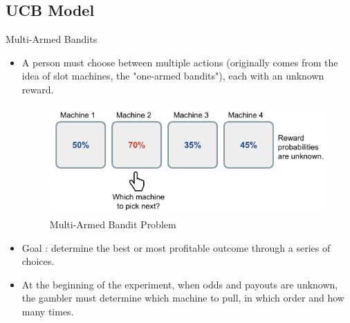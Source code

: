 \documentclass{IFES-beamer}
\begin{document}
    \subsection{UCB Model}
        \begin{frame}{Multi-Armed Bandits}
            \begin{itemize}
                \item A person must choose between multiple actions (originally comes from the idea of slot machines, the "one-armed bandits"), each with an unknown reward.
                \begin{figure}[H]
                    \centering
                    \includegraphics[scale=0.1]{Images/mab.png}
                    \caption{Multi-Armed Bandit Problem}
                    \label{fig:mab}
                \end{figure}
                \item Goal : determine the best or most profitable outcome through a series of choices.
                \item At the beginning of the experiment, when odds and payouts are unknown, the gambler must determine which machine to pull, in which order and how many times. 
            \end{itemize}
        \end{frame}
\end{document}
